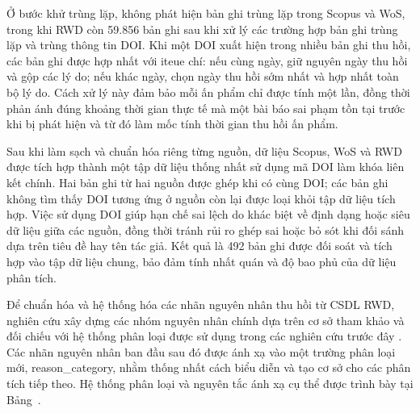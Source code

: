Ở bước khử trùng lặp, không phát hiện bản ghi trùng lặp trong Scopus và WoS, trong khi RWD còn 59.856 bản ghi sau khi xử lý các trường hợp bản ghi trùng lặp và trùng thông tin DOI. Khi một DOI xuất hiện trong nhiều bản ghi thu hồi, các bản ghi được hợp nhất với iteue chí: nếu cùng ngày, giữ nguyên ngày thu hồi và gộp các lý do; nếu khác ngày, chọn ngày thu hồi sớm nhất và hợp nhất toàn bộ lý do. Cách xử lý này đảm bảo mỗi ấn phẩm chỉ được tính một lần, đồng thời phản ánh đúng khoảng thời gian thực tế mà một bài báo sai phạm tồn tại trước khi bị phát hiện và từ đó làm mốc tính thời gian thu hồi ấn phẩm.

Sau khi làm sạch và chuẩn hóa riêng từng nguồn, dữ liệu Scopus, WoS và RWD được tích hợp thành một tập dữ liệu thống nhất sử dụng mã DOI làm khóa liên kết chính. Hai bản ghi từ hai nguồn được ghép khi có cùng DOI; các bản ghi không tìm thấy DOI tương ứng ở nguồn còn lại được loại khỏi tập dữ liệu tích hợp. Việc sử dụng DOI giúp hạn chế sai lệch do khác biệt về định dạng hoặc siêu dữ liệu giữa các nguồn, đồng thời tránh rủi ro ghép sai hoặc bỏ sót khi đối sánh dựa trên tiêu đề hay tên tác giả. Kết quả là 492 bản ghi được đối soát và tích hợp vào tập dữ liệu chung, bảo đảm tính nhất quán và độ bao phủ của dữ liệu phân tích.

Để chuẩn hóa và hệ thống hóa các nhãn nguyên nhân thu hồi từ CSDL RWD, nghiên cứu xây dựng các nhóm nguyên nhân chính dựa trên cơ sở tham khảo và đối chiếu với hệ thống phân loại được sử dụng trong các nghiên cứu trước đây \parencite{tiwari2026, okyay2025}. Các nhãn nguyên nhân ban đầu sau đó được ánh xạ vào một trường phân loại mới, {\sffamily reason\_category}, nhằm thống nhất cách biểu diễn và tạo cơ sở cho các phân tích tiếp theo. Hệ thống phân loại và nguyên tắc ánh xạ cụ thể được trình bày tại Bảng~.


